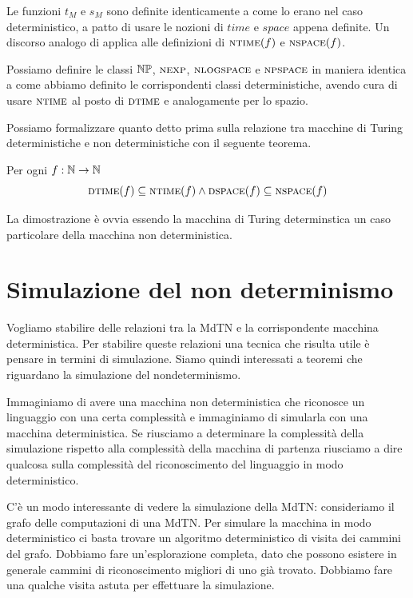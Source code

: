Le funzioni $t_{M}$ e $s_{M}$ sono definite identicamente a come lo erano nel caso deterministico, a
patto di usare le nozioni di $\textit{time}$ e $\textit{space}$ appena definite. Un discorso analogo
di applica alle definizioni di $\textsc{ntime}(f)$ e $\textsc{nspace}(f)$.

Possiamo definire le classi $\mathbb{NP}$, $\textsc{nexp}$, $\textsc{nlogspace}$ e $\textsc{npspace}$ in maniera identica a
come abbiamo definito le corrispondenti classi deterministiche, avendo cura di usare $\textsc{ntime}$ al
posto di $\textsc{dtime}$ e analogamente per lo spazio.

Possiamo formalizzare quanto detto prima sulla relazione tra macchine di Turing deterministiche e
non deterministiche con il seguente teorema.
\begin{thm}
    Per ogni $f: \mathbb{N} \to \mathbb{N}$
    \begin{equation*}
        \textsc{dtime}(f) \subseteq \textsc{ntime}(f) \land \textsc{dspace}(f) \subseteq \textsc{nspace}(f)
    \end{equation*}
\end{thm}
La dimostrazione è ovvia essendo la macchina di Turing determinstica un caso particolare della
macchina non deterministica.


\section{Simulazione del non determinismo}

Vogliamo stabilire delle relazioni tra la MdTN e la corrispondente macchina deterministica. Per
stabilire queste relazioni una tecnica che risulta utile è pensare in termini di simulazione.
Siamo quindi interessati a teoremi che riguardano la simulazione del nondeterminismo.

Immaginiamo di avere una macchina non deterministica che riconosce un linguaggio con una certa
complessità e immaginiamo di simularla con una macchina deterministica. Se riusciamo a determinare
la complessità della simulazione rispetto alla complessità della macchina di partenza riusciamo a
dire qualcosa sulla complessità del riconoscimento del linguaggio in modo deterministico.

C'è un modo interessante di vedere la simulazione della MdTN: consideriamo il grafo delle
computazioni di una MdTN. Per simulare la macchina in modo deterministico ci basta trovare un
algoritmo deterministico di visita dei cammini del grafo. Dobbiamo fare un'esplorazione completa,
dato che possono esistere in generale cammini di riconoscimento migliori di uno già trovato.
Dobbiamo fare una qualche visita astuta per effettuare la simulazione.

